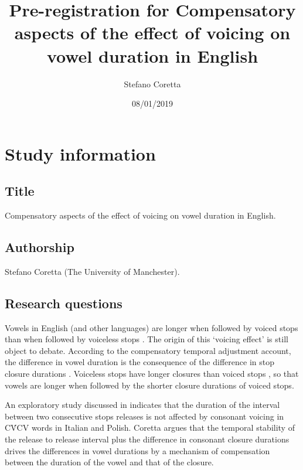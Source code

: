\documentclass[11pt,]{article}
\title{Pre-registration for Compensatory aspects of the effect of voicing on
vowel duration in English}
\author{Stefano Coretta}
\date{08/01/2019}
\begin{document}
\maketitle

\hypertarget{study-information}{%
\section{Study information}\label{study-information}}

\hypertarget{title}{%
\subsection{Title}\label{title}}

Compensatory aspects of the effect of voicing on vowel duration in
English.

\hypertarget{authorship}{%
\subsection{Authorship}\label{authorship}}

Stefano Coretta (The University of Manchester).

\hypertarget{research-questions}{%
\subsection{Research questions}\label{research-questions}}

Vowels in English (and other languages) are longer when followed by
voiced stops than when followed by voiceless stops \citep{heffner1937}.
The origin of this `voicing effect' is still object to debate. According
to the compensatory temporal adjustment account, the difference in vowel
duration is the consequence of the difference in stop closure durations
\citep{lindblom1967, slis1969a, slis1969, lehiste1970, lehiste1970a}.
Voiceless stops have longer closures than voiced stops
\citep{lisker1957, van-summers1987, davis1989, de-jong1991}, so that
vowels are longer when followed by the shorter closure durations of
voiced stops.

An exploratory study discussed in \citet{coretta2018j} indicates that
the duration of the interval between two consecutive stops releases is
not affected by consonant voicing in CV́CV words in Italian and Polish.
Coretta argues that the temporal stability of the release to release
interval plus the difference in consonant closure durations drives the
differences in vowel durations by a mechanism of compensation between
the duration of the vowel and that of the closure.
\end{document}
